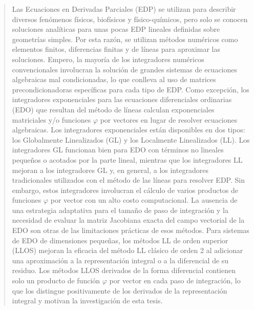 \begin{abstract}
	Las Ecuaciones en Derivadas Parciales (EDP) se utilizan para describir diversos fenómenos físicos, biofísicos y físico-químicos, pero solo se conocen soluciones analíticas para unas pocas EDP lineales definidas sobre geometrías simples. Por esta razón, se utilizan métodos numéricos como elementos finitos, diferencias finitas y de líneas para aproximar las soluciones. Empero, la mayoría de los integradores numéricos convencionales involucran la solución de grandes sistemas de ecuaciones algebraicas mal condicionadas, lo que conlleva al uso de matrices precondicionadoras específicas para cada tipo de EDP. Como excepción, los integradores exponenciales para las ecuaciones diferenciales ordinarias (EDO) que resultan del método de líneas calculan exponenciales matriciales y/o funciones $\varphi$ por vectores en lugar de resolver ecuaciones algebraicas. Los integradores exponenciales están disponibles en dos tipos: los Globalmente Linealizados (GL) y los Localmente Linealizados (LL). Los integradores GL funcionan bien para EDO con términos no lineales pequeños o acotados por la parte lineal, mientras que los integradores LL mejoran a los integradores GL y, en general, a los integradores tradicionales utilizados con el método de las líneas para resolver EDP. Sin embargo, estos integradores involucran el cálculo de varios productos de funciones $\varphi$ por vector con un alto costo  computacional. La ausencia de una estrategia adaptativa para el tamaño de paso de integración y la necesidad de evaluar la matriz Jacobiana exacta del campo vectorial de la EDO son otras de las limitaciones prácticas de esos métodos. Para sistemas de EDO de dimensiones pequeñas, los métodos LL de orden superior (LLOS) mejoran la eficacia del método LL clásico de orden 2 al adicionar una aproximación a la representación integral o a la diferencial de su residuo. Los métodos LLOS derivados de la forma diferencial contienen solo un producto de función $\varphi$ por vector en cada paso de integración, lo que los distingue positivamente de los derivados de la representación integral y motivan la investigación de esta tesis.


\end{abstract}

